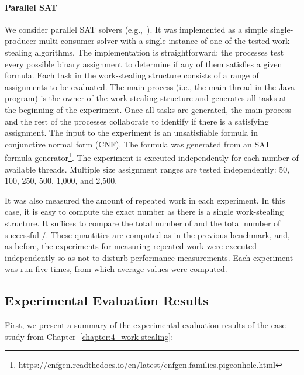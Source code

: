 \paragraph*{Parallel SAT}
We consider parallel SAT solvers (e.g.,~\cite{DBLP_journals_amai_BohmS96, DBLP_journals_entcs_FeldmanDH05, DBLP_books_sp_HS2018}). It was implemented as a simple single-producer multi-consumer solver with a single instance of one of the tested work-stealing algorithms. The implementation is straightforward: the processes test every possible binary assignment to determine if any of them satisfies a given formula. Each task in the work-stealing structure consists of a range of assignments to be evaluated.  The main process (i.e., the main thread in the Java program) is the owner of the work-stealing structure and generates all tasks at the beginning of the experiment. Once all tasks are generated, the main process and the rest of the processes collaborate to identify if there is a satisfying assignment.  The input to the experiment is an unsatisfiable formula in conjunctive normal form (CNF). The formula was generated from an SAT formula generator\footnote{https://cnfgen.readthedocs.io/en/latest/cnfgen.families.pigeonhole.html}.  The experiment is executed independently for each number of available threads.  Multiple size assignment ranges are tested independently: 50, 100, 250, 500, 1,000, and 2,500.

It was also measured the amount of repeated work in each experiment.  In this case, it is easy to compute the exact number as there is a single work-stealing structure. It suffices to compare the total number of \Puts and the total number of successful \Takes/\Steals. These quantities are computed as in the previous benchmark, and, as before, the experiments for measuring repeated work were executed independently so as not to disturb performance measurements. Each experiment was run five times, from which average values were computed.


\subsection{Experimental Evaluation Results}

First, we present a summary of the experimental evaluation results of the case study from Chapter~\ref{chapter:4_work-stealing}:

